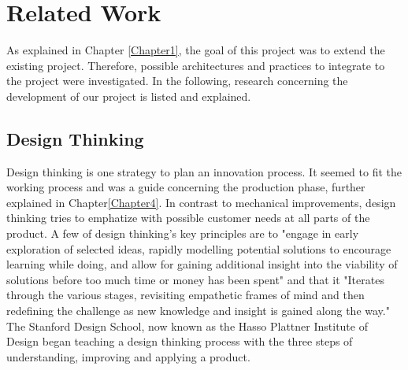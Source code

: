 
\chapter{Related Work} %

\label{Chapter2} %

As explained in Chapter \ref{Chapter1}, the goal of this project was to extend the existing project.
Therefore, possible architectures and practices to integrate to the project were investigated.
In the following, research concerning the development of our project is listed and explained.

\section{Design Thinking}
Design thinking is one strategy to plan an innovation process. 
It seemed to fit the working process and was a guide concerning the production phase, further explained in Chapter\ref{Chapter4}.
In contrast to mechanical improvements, design thinking tries to emphatize with possible customer needs at all parts of the product.
A few of design thinking's key principles are to 
"engage in early exploration of selected ideas, rapidly modelling potential solutions to encourage learning 
while doing, and allow for gaining additional insight into the viability of 
solutions before too much time or money has been spent" and that it 
"Iterates through the various stages, revisiting empathetic frames of mind and then redefining the challenge as new knowledge and insight is gained along the way." 
\parencite{designThinking}
The Stanford Design School, now known as the Hasso Plattner Institute of Design began teaching a design thinking process 
with the three steps of understanding, improving and applying a product. 


